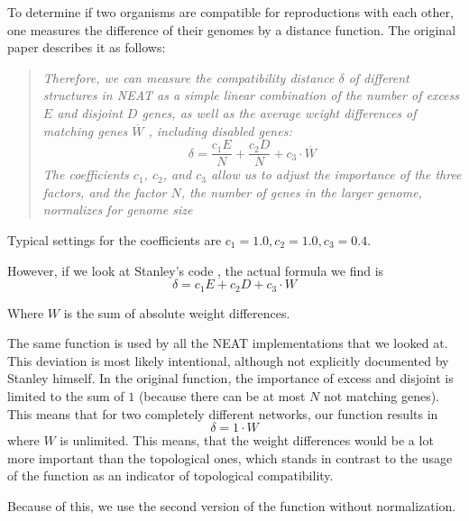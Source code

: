 To determine if two organisms are compatible for reproductions with each other, one measures the difference of their genomes by a distance function.  
The original paper describes it as follows:

\begin{quote}
	\emph{Therefore, we
		can measure the compatibility distance \(\delta\) of different structures in NEAT as a simple linear combination of the number of excess \(E\) and disjoint \(D\) genes, as well as the average weight differences of matching genes \(\overline{W}\)
		, including disabled genes:
		\[
		\delta = \frac{c_1 E}{N} + \frac{c_2 D}{N} + c_3 \cdot \overline{W} 
		\]
		The coefficients \(c_1\), \(c_2\), and \(c_3\) allow us to adjust the importance of the three factors, and the factor \(N\), the number of genes in the larger genome, normalizes for genome size}
\end{quote}  

Typical settings for the coefficients are \(c_1 = 1.0, c_2 = 1.0, c_3 = 0.4\).

\cite{Stanley2002}

However, if we look at Stanley's code \cite{Stanley2012}, the actual formula we find is
\[ \delta = c_1 E + c_2 D + c_3 \cdot W \]  

Where \(W\) is the sum of absolute weight differences.

The same function is used by all the NEAT implementations that we looked at.
This deviation is most likely intentional, although not explicitly documented by Stanley himself. In the original function, the importance of excess and disjoint is limited to the sum of \(1\) (because there can be at most \(N\) not matching genes). This means that for two completely different networks, our function results in
\[\delta = 1 \cdot W \]
where \(W\) is unlimited. This means, that the weight differences would be a lot more important than the topological ones, which stands in contrast to the usage of the function as an indicator of topological compatibility. \cite{Green2009}

Because of this, we use the second version of the function without normalization.
